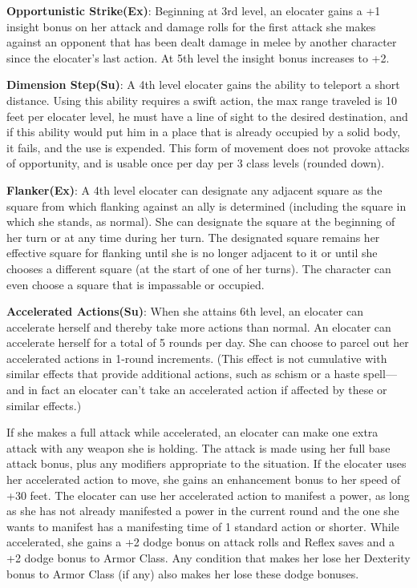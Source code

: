 \textbf{Opportunistic Strike(Ex)}: Beginning at 3rd level, an elocater gains a +1 insight bonus on her attack and damage rolls for the first attack she makes against an opponent that has been dealt damage in melee by another character since the elocater's last action. At 5th level the insight bonus increases to +2.

\textbf{Dimension Step(Su)}: A 4th level elocater gains the ability to teleport a short distance. Using this ability requires a swift action, the max range traveled is 10 feet per elocater level, he must have a line of sight to the desired destination, and if this ability would put him in a place that is already occupied by a solid body, it fails, and the use is expended. This form of movement does not provoke attacks of opportunity, and is usable once per day per 3 class levels (rounded down).

\textbf{Flanker(Ex)}: A 4th level elocater can designate any adjacent square as the square from which flanking against an ally is determined (including the square in which she stands, as normal). She can designate the square at the beginning of her turn or at any time during her turn. The designated square remains her effective square for flanking until she is no longer adjacent to it or until she chooses a different square (at the start of one of her turns). The character can even choose a square that is impassable or occupied.

\textbf{Accelerated Actions(Su)}: When she attains 6th level, an elocater can accelerate herself and thereby take more actions than normal. An elocater can accelerate herself for a total of 5 rounds per day. She can choose to parcel out her accelerated actions in 1-round increments. (This effect is not cumulative with similar effects that provide additional actions, such as schism or a haste spell—and in fact an elocater can’t take an accelerated action if affected by these or similar effects.)

If she makes a full attack while accelerated, an elocater can make one extra attack with any weapon she is holding. The attack is made using her full base attack bonus, plus any modifiers appropriate to the situation. If the elocater uses her accelerated action to move, she gains an enhancement bonus to her speed of +30 feet. The elocater can use her accelerated action to manifest a power, as long as she has not already manifested a power in the current round and the one she wants to manifest has a manifesting time of 1 standard action or shorter. While accelerated, she gains a +2 dodge bonus on attack rolls and Reflex saves and a +2 dodge bonus to Armor Class. Any condition that makes her lose her Dexterity bonus to Armor Class (if any) also makes her lose these dodge bonuses.